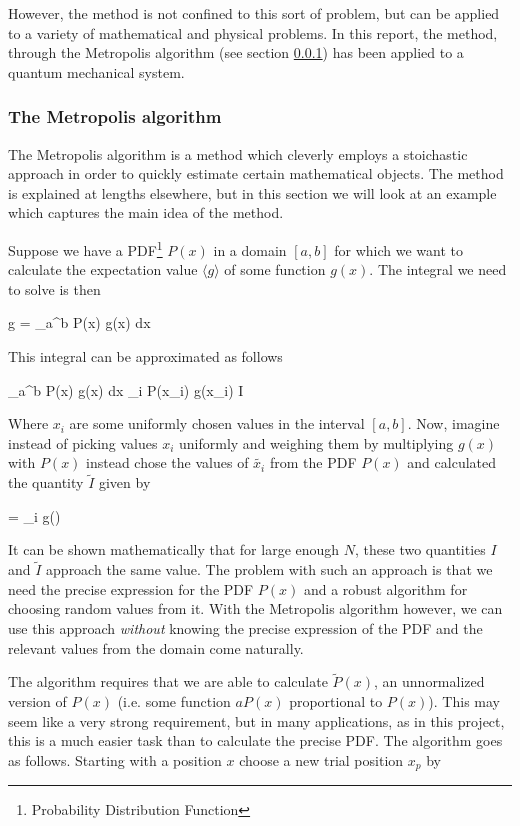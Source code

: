 However, the method is not confined to this sort of problem, but can be applied to a variety of mathematical and physical problems. 
In this report, the method, through the Metropolis algorithm (see section \ref{sec:theory_metropolis}) has been applied to a quantum mechanical system.


\subsubsection{The Metropolis algorithm} \label{sec:theory_metropolis}

The Metropolis algorithm is a method which cleverly employs a stoichastic approach in order to quickly estimate certain mathematical objects.
The method is explained at lengths elsewhere\cite{lecturenotes}, but in this section we will look at an example which captures the main idea of the method.

Suppose we have a PDF\footnote{Probability Distribution Function} $P(x)$ in a domain $[a,b]$ for which we want to calculate the expectation value $\langle g \rangle$ of some function $g(x)$. 
The integral we need to solve is then 

\eqs
\langle g \rangle = \int_a^b P(x) g(x) dx 
\eqf

This integral can be approximated as follows

\eqs
\int_a^b P(x) g(x) dx \approx {} \sum_i P(x_i) g(x_i) \equiv I 
\eqf

Where $x_i$ are some uniformly chosen values in the interval $[a,b]$. 
Now, imagine instead of picking values $x_i$ uniformly and weighing them by multiplying $g(x)$ with $P(x)$ instead chose the values of $\tilde{x_i}$ from the PDF $P(x)$ and calculated the quantity $\tilde{I}$ given by

\eqs
{} =  \sum_i g()
\label{eq:metropolis_integral}
\eqf

It can be shown mathematically that for large enough $N$, these two quantities $I$ and $\tilde{I}$ approach the same value.  
The problem with such an approach is that we need the precise expression for the PDF $P(x)$ and a robust algorithm for choosing random values from it. 
With the Metropolis algorithm however, we can use this approach \textit{without} knowing the precise expression of the PDF and the relevant values from the domain come naturally. 

The algorithm requires that we are able to calculate $\tilde{P}(x)$, an unnormalized version of $P(x)$ (i.e. some function $aP(x)$ proportional to $P(x)$). 
This may seem like a very strong requirement, but in many applications, as in this project, this is a much easier task than to calculate the precise PDF. 
The algorithm goes as follows. 
Starting with a position $x$ choose a new trial position  $x_p$ by

